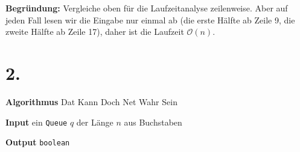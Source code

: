 \documentclass[a4paper]{book}
\theoremstyle{definition}
\begin{document}
\vspace{1cm}

\noindent\textbf{Begründung:} Vergleiche oben für die Laufzeitanalyse zeilenweise. Aber auf jeden Fall lesen wir die Eingabe nur einmal ab (die erste Hälfte ab Zeile 9, die zweite Hälfte ab Zeile 17), daher ist die Laufzeit \(\mathcal{O}(n)\).

\section*{2.}

\textbf{Algorithmus} Dat Kann Doch Net Wahr Sein

\noindent\textbf{Input} ein \texttt{Queue} \(q\) der Länge \(n\) aus Buchstaben

\noindent\textbf{Output} \texttt{boolean}
\end{document}
